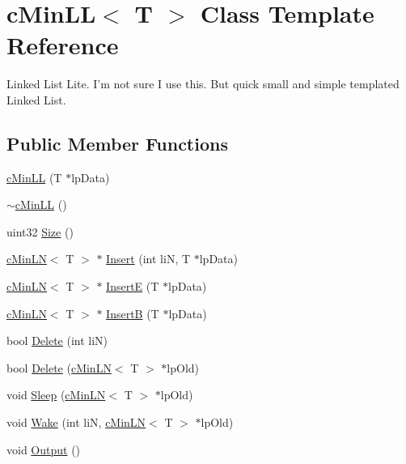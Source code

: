 \hypertarget{classc_min_l_l}{
\section{cMinLL$<$ T $>$ Class Template Reference}
\label{classc_min_l_l}
}


Linked List Lite. I'm not sure I use this. But quick small and simple templated Linked List.  


\subsection*{Public Member Functions}
\begin{DoxyCompactItemize}
\item 
\hyperlink{classc_min_l_l_a6d27d969b2ecce0256b756b80a66494c}{cMinLL} (T $\ast$lpData)
\item 
\hyperlink{classc_min_l_l_aaf9ce821eb5ac28809029d5371198e5e}{$\sim$cMinLL} ()
\item 
uint32 \hyperlink{classc_min_l_l_a63ffd046ccd08dd1a5306238c903538c}{Size} ()
\item 
\hyperlink{classc_min_l_n}{cMinLN}$<$ T $>$ $\ast$ \hyperlink{classc_min_l_l_ab1fe6a837560eff766594c17a0afb1a4}{Insert} (int liN, T $\ast$lpData)
\item 
\hyperlink{classc_min_l_n}{cMinLN}$<$ T $>$ $\ast$ \hyperlink{classc_min_l_l_af91aba7fb87c4eee10957318838a0498}{InsertE} (T $\ast$lpData)
\item 
\hyperlink{classc_min_l_n}{cMinLN}$<$ T $>$ $\ast$ \hyperlink{classc_min_l_l_ad0dfb972ede08a5ef0b9b29968ae13e6}{InsertB} (T $\ast$lpData)
\item 
bool \hyperlink{classc_min_l_l_a2fed135e4f06090bed220326b8e1fb68}{Delete} (int liN)
\item 
bool \hyperlink{classc_min_l_l_ada27117ebdc874dc094ae1e339dbf959}{Delete} (\hyperlink{classc_min_l_n}{cMinLN}$<$ T $>$ $\ast$lpOld)
\item 
void \hyperlink{classc_min_l_l_a2a134b214050f245a8bd9d1846af0870}{Sleep} (\hyperlink{classc_min_l_n}{cMinLN}$<$ T $>$ $\ast$lpOld)
\item 
void \hyperlink{classc_min_l_l_a3bc43d25b2b92f369bbaf51c1cec600a}{Wake} (int liN, \hyperlink{classc_min_l_n}{cMinLN}$<$ T $>$ $\ast$lpOld)
\item 
void \hyperlink{classc_min_l_l_a468631315bd5ff7cbf83b81c2a213eba}{Output} ()
\end{DoxyCompactItemize}
